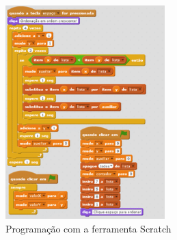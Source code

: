 \begin{figure}[ht]
  \centering
  \includegraphics[width=0.55\textwidth]{images/scratch.png}
  \caption{ Programação com a ferramenta Scratch}\label{scratch}
\end{figure}

